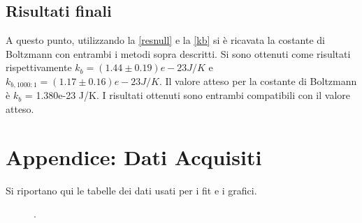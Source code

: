 \documentclass[a4paper,10pt]{article}
\begin{document}


\subsection{Risultati finali}
A questo punto, utilizzando la \eqref{resnull} e la \eqref{kb} si è ricavata la costante di Boltzmann con entrambi i metodi sopra descritti. Si sono ottenuti come risultati rispettivamente $k_b = (1.44\pm0.19)e-23 J/K$ e $k_{b,1000:1} = (1.17\pm0.16)e-23 J/K $. Il valore atteso per la costante di Boltzmann è $k_b$ = 1.380e-23 J/K. I risultati ottenuti sono entrambi compatibili con il valore atteso. 

\section{Appendice: Dati Acquisiti}
Si riportano qui le tabelle dei dati usati per i fit e i grafici.

\begin{table}[H]
	\centering
	
	\caption{.}
	\label{tab:prepreamp}
\end{table}

\begin{table}
	\centering
	
	\caption{.}
	\label{tab:postpreamp}
\end{table}

\begin{figure}
	\begin{minipage}{0.64\textwidth}
		\begin{table}[H]
			\centering
			
			\caption{.}
			\label{tab:bandpass}
		\end{table}
	\end{minipage}
	\begin{minipage}{0.34\textwidth}
		\begin{table}[H]
			\centering
			
			\caption{.}
			\label{tab:RMScal}
		\end{table}
	\end{minipage}
\end{figure}

\begin{table}[H]
	\centering
	
	\caption{.}
	\label{tab:totamp}
\end{table}
\end{document}
